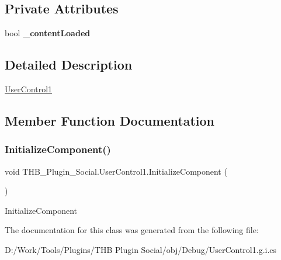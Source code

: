 \subsection*{Private Attributes}
\begin{DoxyCompactItemize}
\item 
\mbox{\label{class_t_h_b___plugin___social_1_1_user_control1_a3f1b09bbced6d4b895eff4b6a376601e}} 
bool {\bfseries \+\_\+content\+Loaded}
\end{DoxyCompactItemize}


\subsection{Detailed Description}
\mbox{\hyperlink{class_t_h_b___plugin___social_1_1_user_control1}{User\+Control1}} 



\subsection{Member Function Documentation}
\mbox{\label{class_t_h_b___plugin___social_1_1_user_control1_a25fbdc8418a5a7c4054d91d6aeb14fcf}} 
\subsubsection{\texorpdfstring{Initialize\+Component()}{InitializeComponent()}}
{\footnotesize\ttfamily void T\+H\+B\+\_\+\+Plugin\+\_\+\+Social.\+User\+Control1.\+Initialize\+Component (\begin{DoxyParamCaption}{ }\end{DoxyParamCaption})}



Initialize\+Component 



The documentation for this class was generated from the following file\+:\begin{DoxyCompactItemize}
\item 
D\+:/\+Work/\+Tools/\+Plugins/\+T\+H\+B Plugin Social/obj/\+Debug/User\+Control1.\+g.\+i.\+cs\end{DoxyCompactItemize}
